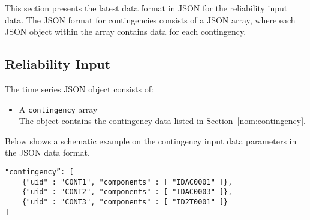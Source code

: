 \label{sec:reliability}
This section presents the latest data format in JSON for the reliability input data.
The JSON format for contingencies consists of a JSON array,
where each JSON object within the array contains data for each contingency.

\subsection{Reliability Input}
\label{sec:input_data}
The time series JSON object consists of:
\begin{itemize}
    \item A \texttt{contingency} array\\
        The object contains the contingency data listed in Section~\ref{nom:contingency}.
\end{itemize}


Below shows a schematic example on the contingency input data parameters in the JSON data format.
\begin{verbatim}
"contingency”: [
    {"uid" : "CONT1", "components" : [ "IDAC0001" ]},
    {"uid" : "CONT2", "components" : [ "IDAC0003" ]},
    {"uid" : "CONT3", "components" : [ "ID2T0001" ]}
]
\end{verbatim}


